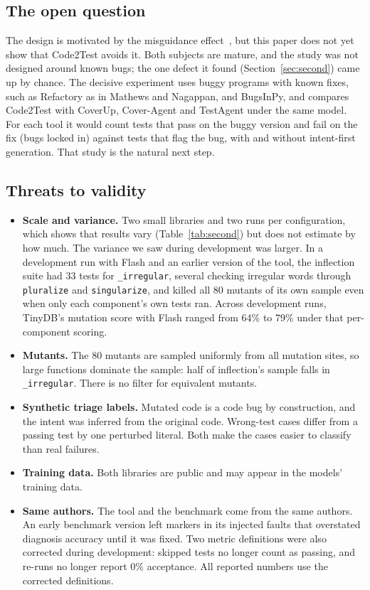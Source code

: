\documentclass[11pt]{article}
\newcommand{\toolname}{Code2Test}
\newcommand{\code}[1]{\texttt{#1}}
\begin{document}
\subsection{The open question}
The design is motivated by the misguidance effect~\cite{mathews2024design,zhao2026misguidance}, but this paper does not yet show that \toolname{} avoids it.
Both subjects are mature, and the study was not designed around known bugs; the one defect it found (Section~\ref{sec:second}) came up by chance.
The decisive experiment uses buggy programs with known fixes, such as Refactory as in Mathews and Nagappan, and BugsInPy, and compares \toolname{} with CoverUp, Cover-Agent and TestAgent under the same model.
For each tool it would count tests that pass on the buggy version and fail on the fix (bugs locked in) against tests that flag the bug, with and without intent-first generation.
That study is the natural next step.

\subsection{Threats to validity}\label{sec:threats}
\begin{itemize}
  \item \textbf{Scale and variance.} Two small libraries and two runs per configuration, which shows that results vary (Table~\ref{tab:second}) but does not estimate by how much. The variance we saw during development was larger.
  In a development run with Flash and an earlier version of the tool, the inflection suite had 33 tests for \code{\_irregular}, several checking irregular words through \code{pluralize} and \code{singularize}, and killed all 80 mutants of its own sample even when only each component's own tests ran.
  Across development runs, TinyDB's mutation score with Flash ranged from 64\% to 79\% under that per-component scoring.
  \item \textbf{Mutants.} The 80 mutants are sampled uniformly from all mutation sites, so large functions dominate the sample: half of inflection's sample falls in \code{\_irregular}. There is no filter for equivalent mutants.
  \item \textbf{Synthetic triage labels.} Mutated code is a code bug by construction, and the intent was inferred from the original code. Wrong-test cases differ from a passing test by one perturbed literal. Both make the cases easier to classify than real failures.
  \item \textbf{Training data.} Both libraries are public and may appear in the models' training data.
  \item \textbf{Same authors.} The tool and the benchmark come from the same authors. An early benchmark version left markers in its injected faults that overstated diagnosis accuracy until it was fixed. Two metric definitions were also corrected during development: skipped tests no longer count as passing, and re-runs no longer report 0\% acceptance. All reported numbers use the corrected definitions.
\end{itemize}
\end{document}
